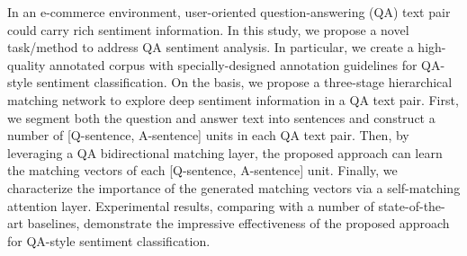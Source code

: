 In an e-commerce environment, user-oriented question-answering (QA) text pair could carry rich sentiment information. In this study, we propose a novel task/method to address QA sentiment analysis. In particular, we create a high-quality annotated corpus with specially-designed annotation guidelines for QA-style sentiment classification. On the basis, we propose a three-stage hierarchical matching network to explore deep sentiment information in a QA text pair. First, we segment both the question and answer text into sentences and construct a number of [Q-sentence, A-sentence] units in each QA text pair. Then, by leveraging a QA bidirectional matching layer, the proposed approach can learn the matching vectors of each [Q-sentence, A-sentence] unit. Finally, we characterize the importance of the generated matching vectors via a self-matching attention layer. Experimental results, comparing with a number of state-of-the-art baselines, demonstrate the impressive effectiveness of the proposed approach for QA-style sentiment classification.
